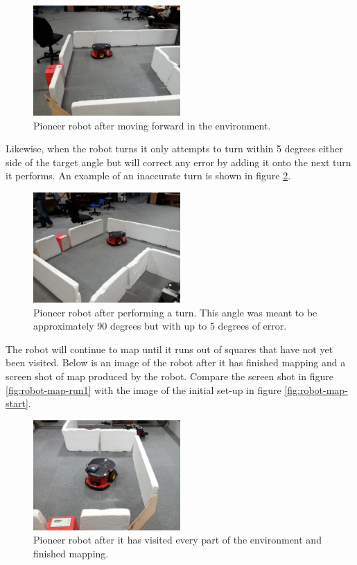 \documentclass{article}
\begin{document}
\begin{figure}[H]
\centering
\includegraphics[width=0.5\textwidth]{img/robot_pics/20130416_132253.jpg}
\caption{Pioneer robot after moving forward in the environment.}
\label{fig:robot-map-moved}
\end{figure}

Likewise, when the robot turns it only attempts to turn within 5 degrees either side of the target angle but will correct any error by adding it onto the next turn it performs. An example of an inaccurate turn is shown in figure \ref{fig:robot-map-turned}.

\begin{figure}[H]
\centering
\includegraphics[width=0.5\textwidth]{img/robot_pics/20130416_132300.jpg}
\caption{Pioneer robot after performing a turn. This angle was meant to be approximately 90 degrees but with up to 5 degrees of error.}
\label{fig:robot-map-turned}
\end{figure}

The robot will continue to map until it runs out of squares that have not yet been visited. Below is an image of the robot after it has finished mapping and a screen shot of map produced by the robot. Compare the screen shot in figure \ref{fig:robot-map-run1} with the image of the initial set-up in figure \ref{fig:robot-map-start}.

\begin{figure}[H]
\centering
\includegraphics[width=0.5\textwidth]{img/robot_pics/20130416_133043.jpg}
\caption{Pioneer robot after it has visited every part of the environment and finished mapping.}
\label{fig:robot-map-finished}
\end{figure}
\end{document}
